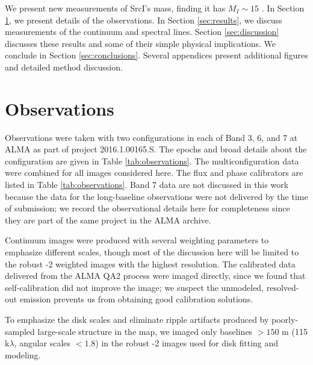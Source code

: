 \documentclass[twocolumn]{aastex61}
\newcommand{\sourcei}{SrcI\xspace}
\begin{document}
We present new measurements of \sourcei's mass, finding it has $M_I \sim 15$ \msun.
In Section \ref{sec:observations}, we present details of the observations.
In Section \ref{sec:results}, we discuss measurements of the continuum
and spectral lines.  Section \ref{sec:discussion} discusses these results and
some of their simple physical implications.
We conclude in Section \ref{sec:conclusions}.
Several appendices present additional figures and detailed method discussion.


\section{Observations}
\label{sec:observations}

Observations were taken with two configurations in each of Band 3, 6, and 7 at
ALMA as part of project 2016.1.00165.S.  The epochs and broad details about the
configuration are given in Table \ref{tab:observations}.  The
multiconfiguration data were combined for all
images considered here.
The flux and phase calibrators are listed in Table \ref{tab:observations}.
Band 7 data are not discussed in this work because the data for
the long-baseline observations were not delivered by the time of submission; we
record the observational details here for completeness since they are part of
the same project in the ALMA archive.

Continuum images were produced with several weighting parameters to emphasize
different scales, though most of the discussion here will be limited to the
robust -2 weighted images with the highest resolution.  The calibrated data
delivered from the ALMA QA2 process were imaged directly, since we found
that self-calibration did not improve the image; we suspect the unmodeled, resolved-out
emission prevents us from obtaining good calibration solutions.

To emphasize the disk scales and eliminate ripple artifacts produced by
poorly-sampled large-scale structure in the map, we imaged only baselines
$>150$ m (115 k$\lambda$, angular scales $<1.8$\arcsec) in the robust -2 images
used for disk fitting and modeling.
\end{document}

